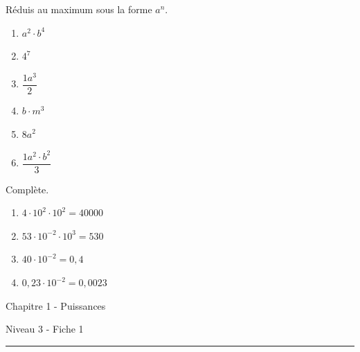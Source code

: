\documentclass[12pt,parskip=half-, twoside=semi]{scrartcl}
\begin{document}
\begin{exercise}
  Réduis au maximum sous la forme $a^n$.
  \begin{enumerate}[cols=3]
    \item \(a^2 \cdot b^4 \)
    \item \(4^7\)
    \item \(\dfrac{1{a}^{3}}{2} \)
    \item \(b \cdot m^{3}\)
    \item \(8a^{2}\)
    \item \(\dfrac{1{a}^{2} \cdot b^{2}}{3} \)
  \end{enumerate}
\end{exercise}

\begin{exercise}
  Complète.
  \begin{enumerate}[cols=2]
    \item \(4 \cdot 10^{2} \cdot 10^{2} = 40000\)
    \item \(53 \cdot 10^{-2} \cdot 10^{3} = 530\)
    \item \(40 \cdot 10^{-2} = 0,4\)
    \item \(0,23 \cdot 10^{-2} = 0,0023\)
  \end{enumerate}
\end{exercise}


\newpage
\begin{center}
  \bfseries
  \begin{Huge}
    Chapitre 1 - Puissances
  \end{Huge}
  \smallbreak
  \begin{large}
    Niveau 3  - Fiche 1
  \end{large}
  \smallbreak
  \rule[10pt]{.5\linewidth}{1 pt}
\end{center}

\setcounter{exercise}{0}
\end{document}
